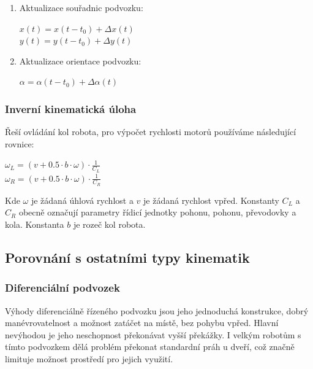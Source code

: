 \begin{enumerate}
\begin{center}
          \end{center}
    \item Aktualizace souřadnic podvozku:
          \begin{center}
              \(x(t) = x(t-t_0) + \Delta x(t)\)\\
              \(y(t) = y(t-t_0) + \Delta y(t)\)
          \end{center}
    \item Aktualizace orientace podvozku:
          \begin{center}
              \(\alpha = \alpha(t-t_0) + \Delta \alpha(t)\)
          \end{center}
\end{enumerate}

\subsubsection{Inverní kinematická úloha}
Řeší ovládání kol robota, pro výpočet rychlosti motorů používáme následující rovnice:\\
\begin{center}
    \(\omega_{L} = (v + 0.5\cdot b \cdot \omega)\cdot \frac{1}{C_L}\)\\
    \(\omega_{R} = (v + 0.5\cdot b \cdot \omega)\cdot \frac{1}{C_R}\)
\end{center}
Kde \(\omega \) je žádaná úhlová rychlost a \(v\) je žádaná rychlost vpřed. Konstanty \(C_L\) a \(C_R\) obecně označují parametry řídicí jednotky pohonu, pohonu, převodovky a kola. Konstanta \(b\) je rozeč kol robota.\\

\subsection{Porovnání s ostatními typy kinematik}
\subsubsection{Diferenciální podvozek}
Výhody diferenciálně řízeného podvozku jsou jeho jednoduchá konstrukce, dobrý manévrovatelnost a možnost zatáčet na místě, bez pohybu vpřed.
Hlavní nevýhodou je jeho neschopnost překonávat vyšší překážky. I velkým robotům s tímto podvozkem dělá problém překonat standardní práh u dveří, což značně limituje možnost prostředí pro jejich využití. \\
